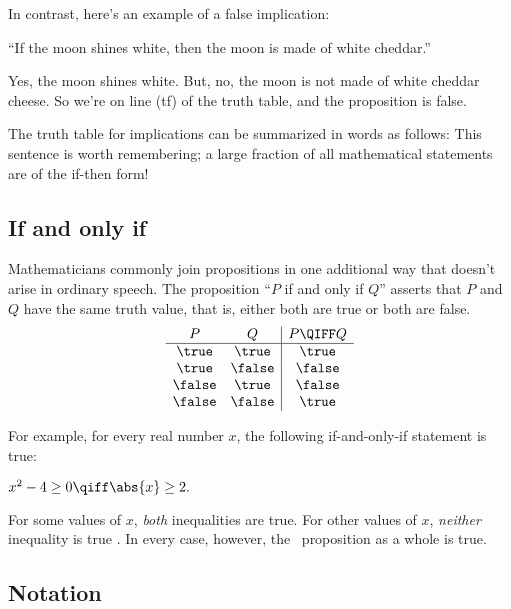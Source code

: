 In contrast, here's an example of a false implication:
%
\begin{center}
``If the moon shines white, then the moon is made of white cheddar.''
\end{center}
%
Yes, the moon shines white.  But, no, the moon is not made of white
cheddar cheese.  So we're on line (tf) of the truth table, and the
proposition is false.

The truth table for implications can be summarized in words as
follows:
%
%
This sentence is worth remembering; a large fraction of all
mathematical statements are of the if-then form!

\subsection{If and only if}

Mathematicians commonly join propositions in one additional way that
doesn't arise in ordinary speech.  The proposition ``$P$ if and only
if $Q$'' asserts that $P$ and $Q$ have the same truth value, that is,
either both are true or both are false.
%
\[
\begin{array}{cc|c}
P & Q & P \QIFF Q \\ \hline
\true & \true & \true \\
\true & \false & \false \\
\false & \true & \false \\
\false & \false & \true
\end{array}
\]

For example, for every real number $x$, the following if-and-only-if
statement is true:
%
\begin{center}
$x^2 - 4 \geq 0 \qiff \abs{x} \geq 2.$
\end{center}
%
For some values of $x$, \emph{both} inequalities are true.  For
other values of $x$, \emph{neither} inequality is true .  In every
case, however, the \QIFF\ proposition as a whole is true.

\subsection{Notation}

